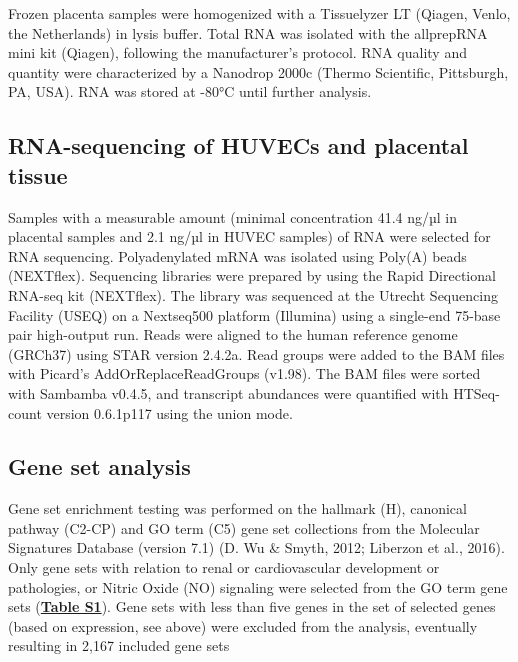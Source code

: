 \documentclass[authordate, empirical]{jote-new-article}
\begin{document}
Frozen placenta samples were homogenized with a Tissuelyzer LT (Qiagen, Venlo, the Netherlands) in lysis buffer. Total RNA was isolated with the allprepRNA mini kit (Qiagen), following the manufacturer's protocol. RNA quality and quantity were characterized by a Nanodrop 2000c (Thermo Scientific, Pittsburgh, PA, USA). RNA was stored at -80°C until further analysis.







\subsection{RNA-sequencing of HUVECs and placental tissue}



Samples with a measurable amount (minimal concentration 41.4 ng/µl in placental samples and 2.1 ng/µl in HUVEC samples) of RNA were selected for RNA sequencing. Polyadenylated mRNA was isolated using Poly(A) beads (NEXTflex). Sequencing libraries were prepared by using the Rapid Directional RNA-seq kit (NEXTflex). The library was sequenced at the Utrecht Sequencing Facility (USEQ) on a Nextseq500 platform (Illumina) using a single-end 75-base pair high-output run. Reads were aligned to the human reference genome (GRCh37) using STAR version 2.4.2a. Read groups were added to the BAM files with Picard's AddOrReplaceReadGroups (v1.98). The BAM files were sorted with Sambamba v0.4.5, and transcript abundances were quantified with HTSeq-count version 0.6.1p117 using the union mode.







\subsection{Gene set analysis }



Gene set enrichment testing was performed on the hallmark (H), canonical pathway (C2-CP) and GO term (C5) gene set collections from the Molecular Signatures Database (version 7.1) (D.
Wu \& Smyth, 2012; Liberzon et al., 2016). Only gene sets with relation to renal or cardiovascular development or pathologies, or Nitric Oxide (NO) signaling were selected from the GO term gene sets (\textbf{\href{https://journal.trialanderror.org/pub/prenatal-sildenafil-pregnancies\#supplementary-materials}{Table S1}}). Gene sets with less than five genes in the set of selected genes (based on expression, see above) were excluded from the analysis, eventually resulting in 2,167 included gene sets
\end{document}
